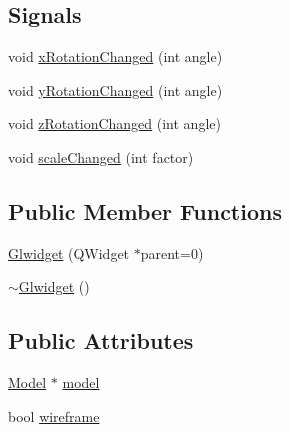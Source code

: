 \subsection*{Signals}
\begin{DoxyCompactItemize}
\item 
void \mbox{\hyperlink{class_glwidget_a179006a4c52b573f9e6791deb16f1f2a}{x\+Rotation\+Changed}} (int angle)
\item 
void \mbox{\hyperlink{class_glwidget_a7c8d9abf4c47760ea6c6fff8ed12e0a5}{y\+Rotation\+Changed}} (int angle)
\item 
void \mbox{\hyperlink{class_glwidget_ab1b7ea4daa9671708ba4dd12fa8c52a9}{z\+Rotation\+Changed}} (int angle)
\item 
void \mbox{\hyperlink{class_glwidget_a874d1da9fed05d5063176ec5195aa483}{scale\+Changed}} (int factor)
\end{DoxyCompactItemize}
\subsection*{Public Member Functions}
\begin{DoxyCompactItemize}
\item 
\mbox{\hyperlink{class_glwidget_a498977aa216afadd4adba780063356ac}{Glwidget}} (Q\+Widget $\ast$parent=0)
\item 
\mbox{\hyperlink{class_glwidget_acaef15b194db8b00381aaa0e7e4c9389}{$\sim$\+Glwidget}} ()
\end{DoxyCompactItemize}
\subsection*{Public Attributes}
\begin{DoxyCompactItemize}
\item 
\mbox{\hyperlink{class_model}{Model}} $\ast$ \mbox{\hyperlink{class_glwidget_a160da762ff1b4a6c1bf6f09bfb71e15c}{model}}
\item 
bool \mbox{\hyperlink{class_glwidget_abe8b6e5adc693200d652414fd8929f46}{wireframe}}
\end{DoxyCompactItemize}
